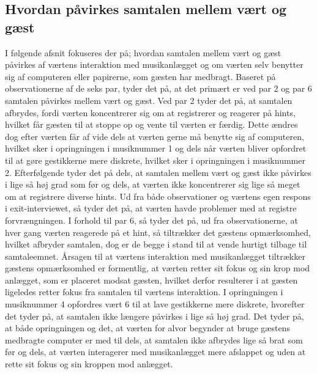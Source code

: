 \subsection{Hvordan påvirkes samtalen mellem vært og gæst}
\label{TestresultaterSocialAcceptSamtale}
%
I følgende afsnit fokuseres der på; hvordan samtalen mellem vært og gæst påvirkes af værtens interaktion med musikanlægget og om værten selv benytter sig af computeren eller papirerne, som gæsten har medbragt. \blankline
%
Baseret på observationerne af de seks par, tyder det på, at det primært er ved par 2 og par 6 samtalen påvirkes mellem vært og gæst. Ved par 2 tyder det på, at samtalen afbrydes, fordi værten koncentrerer sig om at registrerer og reagerer på hints, hvilket får gæsten til at stoppe op og vente til værten er færdig. Dette ændres dog efter værten får af vide dels at værten gerne må benytte sig af computeren, hvilket sker i opringningen i musiknummer 1 og dels når værten bliver opfordret til at gøre gestikkerne mere diskrete, hvilket sker i opringningen i musiknummer 2. Efterfølgende tyder det på dels, at samtalen mellem vært og gæst ikke påvirkes i lige så høj grad som før og dels, at værten ikke koncentrerer sig lige så meget om at registrere diverse hints. Ud fra både observationer og værtens egen respons i exit-interviewet, så tyder det på, at værten havde problemer med at registre forvrængningen. I forhold til par 6, så tyder det på, ud fra observationerne, at hver gang værten reagerede på et hint, så tiltrækker det gæstens opmærksomhed, hvilket afbryder samtalen, dog er de begge i stand til at vende hurtigt tilbage til samtaleemnet. Årsagen til at værtens interaktion med musikanlægget tiltrækker gæstens opmærksomhed er formentlig, at værten retter sit fokus og sin krop mod anlægget, som er placeret modsat gæsten, hvilket derfor resulterer i at gæsten ligeledes retter fokus fra samtalen til værtens interaktion. I opringningen i musiknummer 4 opfordres vært 6 til at lave gestikkerne mere diskrete, hvorefter det tyder på, at samtalen ikke længere påvirkes i lige så høj grad. Det tyder på, at både opringningen og det, at værten for alvor begynder at bruge gæstens medbragte computer er med til dels, at samtalen ikke afbrydes lige så brat som før og dels, at værten interagerer med musikanlægget mere afslappet og uden at rette sit fokus og sin kroppen mod anlægget.


